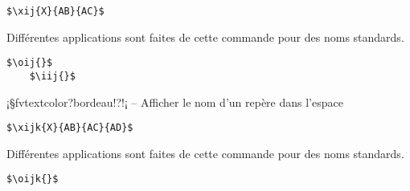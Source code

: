 \documentclass[11pt,a4paper,rgb]{report}
\begin{document}
\colorbox{blue!15}{}
\hfill
\begin{minipage}{.65\textwidth}
	\begin{lstlisting}[linewidth=\textwidth, language={[LaTeX]TeX}]
	$\xij{X}{AB}{AC}$
	\end{lstlisting}
\end{minipage}

Différentes applications sont faites de cette commande pour des noms standards.

\colorbox{blue!15}{}
\hfill
\begin{minipage}{.65\textwidth}
	\begin{lstlisting}[linewidth=\textwidth, language={[LaTeX]TeX}]
	$\oij{}$
	$\iij{}$
	\end{lstlisting}
\end{minipage}

\setlength{\leftskip}{0pt}
\setlength{\textwidth}{18cm}%



\vspace*{.75cm}

\inCodeStub¡§fvtextcolor?bordeau!?!¡ -- Afficher le nom d'un repère dans l'espace

\setlength{\leftskip}{.75cm}%
\setlength{\textwidth}{17.25cm}%

\colorbox{blue!15}{}
\hfill
\begin{minipage}{.65\textwidth}
	\begin{lstlisting}[linewidth=\textwidth, language={[LaTeX]TeX}]
	$\xijk{X}{AB}{AC}{AD}$
	\end{lstlisting}
\end{minipage}

Différentes applications sont faites de cette commande pour des noms standards.

\colorbox{blue!15}{}
\hfill
\begin{minipage}{.65\textwidth}
	\begin{lstlisting}[linewidth=\textwidth, language={[LaTeX]TeX}]
	$\oijk{}$
	\end{lstlisting}
\end{minipage}

\setlength{\leftskip}{0pt}
\setlength{\textwidth}{18cm}%
\end{document}

